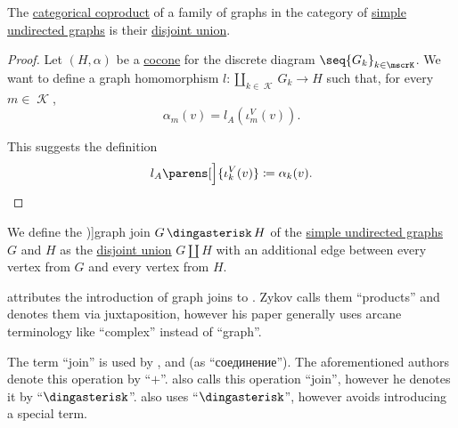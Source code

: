 \begin{proposition}\label{thm:undirected_graph_coproduct}
  The \hyperref[def:discrete_category_limits]{categorical coproduct} of a family of graphs in the category of \hyperref[def:undirected_graph]{simple undirected graphs} is their \hyperref[def:graph_disjoint_union]{disjoint union}.
\end{proposition}
\begin{proof}
  Let \( (H, \alpha) \) be a \hyperref[def:category_of_cones/cocone]{cocone} for the discrete diagram \( \seq{ G_k }_{k \in \mscrK} \). We want to define a graph homomorphism \( l: \coprod_{k \in \mscrK} G_k \to H \) such that, for every \( m \in \mscrK \),
  \begin{equation*}
    \alpha_m(v) = l_A(\iota^V_m(v)).
  \end{equation*}

  This suggests the definition
  \begin{equation*}
    l_A\parens[\Big]{ \iota^V_k(v) } \coloneqq \alpha_k(v).
  \end{equation*}
\end{proof}

\begin{definition}\label{def:graph_join}
  We define the \term[ru=соединение (графов) (\cite[265]{Новиков2013})]{graph join} \( G \Ast H \) of the \hyperref[def:undirected_graph]{simple undirected graphs} \( G \) and \( H \) as the \hyperref[def:graph_disjoint_union]{disjoint union} \( G \coprod H \) with an additional edge between every vertex from \( G \) and every vertex from \( H \).
\end{definition}
\begin{comments}
  \item {} attributes the introduction of graph joins to \cite[164]{Зыков1949}. Zykov calls them \enquote{products} and denotes them via juxtaposition, however his paper generally uses arcane terminology like \enquote{complex} instead of \enquote{graph}.

  The term \enquote{join} is used by ,  and  (as \enquote{соединение}). The aforementioned authors denote this operation by \enquote{\( + \)}.  also calls this operation \enquote{join}, however he denotes it by \enquote{\( \Ast \)}.  also uses \enquote{\( \Ast \)}, however avoids introducing a special term.
\end{comments}

